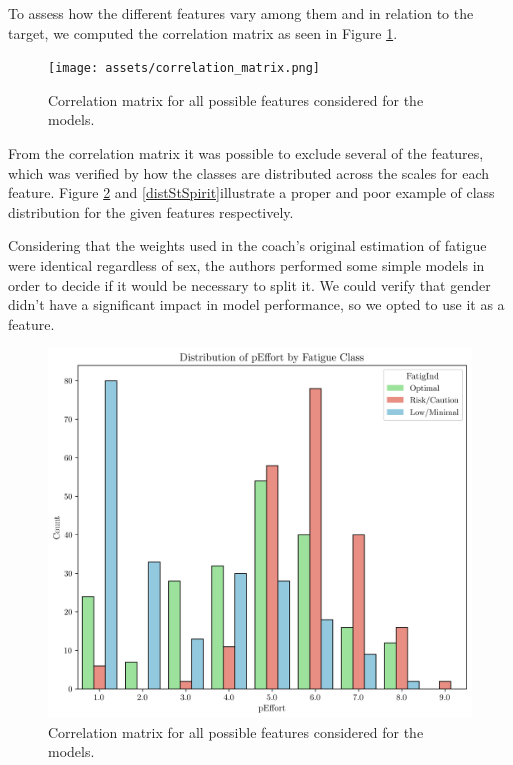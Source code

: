 \documentclass[conference]{IEEEtran}
\begin{document}
To assess how the different features vary among them and in relation to the target, we computed the correlation matrix as seen in Figure \ref{fig:correlationMatrix}.

\begin{figure}[H]
    \centering
    \texttt{[image: assets/correlation\_matrix.png]}
    \caption{Correlation matrix for all possible features considered for the models.}
    \label{fig:correlationMatrix}
\end{figure} %

From the correlation matrix it was possible to exclude several of the features, which was verified by how the classes are distributed across the scales for each feature. Figure \ref{distpEffort} and \ref{distStSpirit}illustrate a proper and poor example of class distribution for the given features respectively.

Considering that the weights used in the coach's original estimation of fatigue were identical regardless of sex, the authors performed some simple models in order to decide if it would be necessary to split it. We could verify that gender didn't have a significant impact in model performance, so we opted to use it as a feature. 

\begin{figure}[H]
    \centering
    \includegraphics[width=1\linewidth]{assets/distribution_pEffort.png}
    \caption{Correlation matrix for all possible features considered for the models.}
    \label{distpEffort}
\end{figure} %
\end{document}
